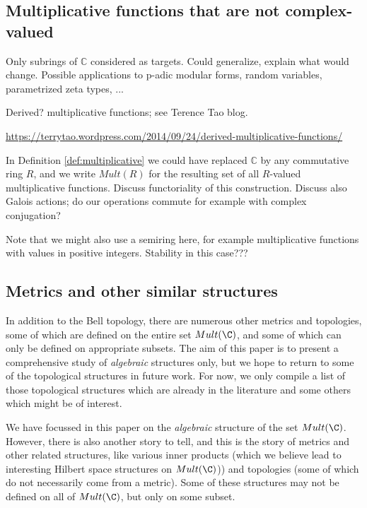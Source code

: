 \documentclass[a4paper]{article}
\begin{document}
\subsection{Multiplicative functions that are not complex-valued}

Only subrings of $\mathbb{C}$ considered as targets. Could generalize, explain what would change. Possible applications to p-adic modular forms, random variables, parametrized zeta types, ...


Derived? multiplicative functions; see Terence Tao blog.

\url{https://terrytao.wordpress.com/2014/09/24/derived-multiplicative-functions/}



In Definition \ref{def:multiplicative} we could have replaced $\mathbb{C}$ by any commutative ring $R$, and we write $Mult(R)$ for the resulting set of all $R$-valued multiplicative functions. Discuss functoriality of this construction. Discuss also Galois actions; do our operations commute for example with complex conjugation? 

Note that we might also use a semiring here, for example multiplicative functions with values in positive integers. Stability in this case???











\subsection{Metrics and other similar structures}

In addition to the Bell topology, there are numerous other metrics and topologies, some of which are defined on the entire set $Mult(\C)$, and some of which can only be defined on appropriate subsets. The aim of this paper is to present a comprehensive study of \emph{algebraic} structures only, but we hope to return to some of the topological structures in future work. For now, we only compile a list of those topological structures which are already in the literature and some others which might be of interest.



We have focussed in this paper on the \emph{algebraic} structure of the set $Mult(\C)$. However, there is also another story to tell, and this is the story of metrics and other related structures, like various inner products (which we believe lead to interesting Hilbert space structures on $Mult(\C)$)) and topologies (some of which do not necessarily come from a metric). Some of these structures may not be defined on all of $Mult(\C)$, but only on some subset.
\end{document}

